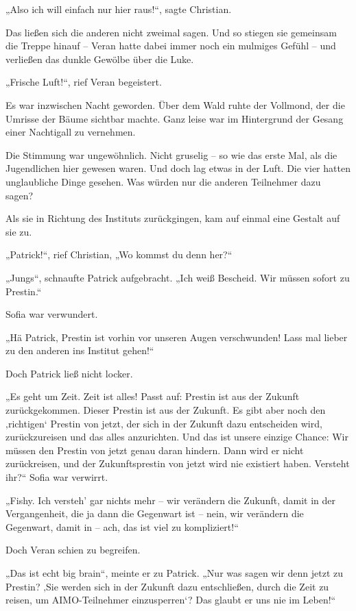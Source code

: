 \documentclass[oneside]{memoir}
\begin{document}
„Also ich will einfach nur hier raus!“, sagte Christian.

Das ließen sich die anderen nicht zweimal sagen. Und so stiegen sie gemeinsam die Treppe hinauf -- Veran hatte dabei immer noch ein mulmiges Gefühl -- und verließen das dunkle Gewölbe über die Luke.

„Frische Luft!“, rief Veran begeistert.

Es war inzwischen Nacht geworden. Über dem Wald ruhte der Vollmond, der die Umrisse der Bäume sichtbar machte. Ganz leise war im Hintergrund der Gesang einer Nachtigall zu vernehmen.

Die Stimmung war ungewöhnlich. Nicht gruselig – so wie das erste Mal, als die Jugendlichen hier gewesen waren. Und doch lag etwas in der Luft. Die vier hatten unglaubliche Dinge gesehen. Was würden nur die anderen Teilnehmer dazu sagen?

\bigskip
Als sie in Richtung des Instituts zurückgingen, kam auf einmal eine Gestalt auf sie zu.

„Patrick!“, rief Christian, „Wo kommst du denn her?“

„Jungs“, schnaufte Patrick aufgebracht. „Ich weiß Bescheid. Wir müssen sofort zu Prestin.“

Sofia war verwundert.

„Hä Patrick, Prestin ist vorhin vor unseren Augen verschwunden! Lass mal lieber zu den anderen ins Institut gehen!“

Doch Patrick ließ nicht locker.

„Es geht um Zeit. Zeit ist alles! Passt auf: Prestin ist aus der Zukunft zurückgekommen. Dieser Prestin ist aus der Zukunft. Es gibt aber noch den ‚richtigen‘ Prestin von jetzt, der sich in der Zukunft dazu entscheiden wird, zurückzureisen und das alles anzurichten. Und das ist unsere einzige Chance: Wir müssen den Prestin von jetzt genau daran hindern. Dann wird er nicht zurückreisen, und der Zukunftsprestin von jetzt wird nie existiert haben. Versteht ihr?“
Sofia war verwirrt.

„Fishy. Ich versteh' gar nichts mehr – wir verändern die Zukunft, damit in der Vergangenheit, die ja dann die Gegenwart ist – nein, wir verändern die Gegenwart, damit in – ach, das ist viel zu kompliziert!“

Doch Veran schien zu begreifen.

„Das ist echt big brain“, meinte er zu Patrick. „Nur was sagen wir denn jetzt zu Prestin? ‚Sie werden sich in der Zukunft dazu entschließen, durch die Zeit zu reisen, um AIMO-Teilnehmer einzusperren‘? Das glaubt er uns nie im Leben!“
\end{document}
